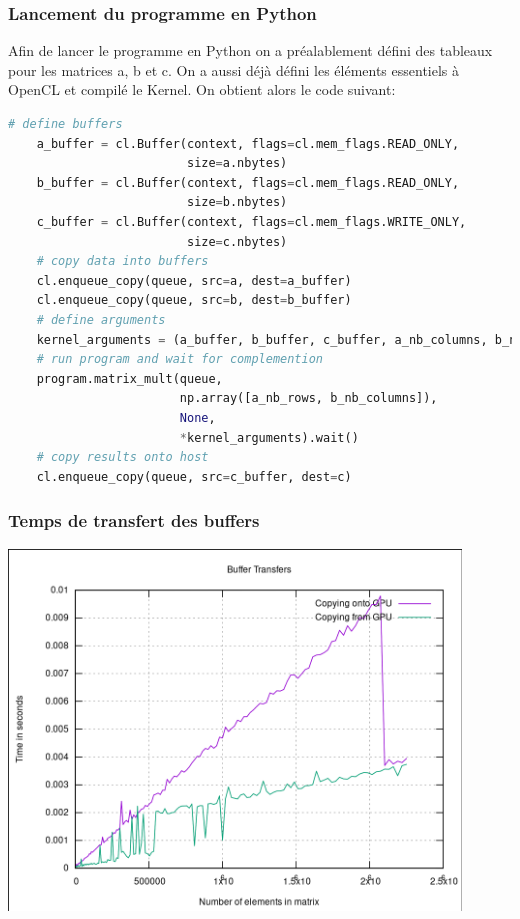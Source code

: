 \documentclass[8pt]{beamer}
\begin{document}
\begin{frame}[fragile]
    \frametitle{Lancement du programme en Python}
    Afin de lancer le programme en Python on a préalablement défini des 
    tableaux pour les matrices a, b et c. On a aussi déjà défini les éléments 
    essentiels à OpenCL et compilé le Kernel.
    On obtient alors le code suivant:
    \begin{lstlisting}[language=python]
    # define buffers
    a_buffer = cl.Buffer(context, flags=cl.mem_flags.READ_ONLY, 
                         size=a.nbytes)
    b_buffer = cl.Buffer(context, flags=cl.mem_flags.READ_ONLY, 
                         size=b.nbytes)
    c_buffer = cl.Buffer(context, flags=cl.mem_flags.WRITE_ONLY, 
                         size=c.nbytes)
    # copy data into buffers
    cl.enqueue_copy(queue, src=a, dest=a_buffer)
    cl.enqueue_copy(queue, src=b, dest=b_buffer)
    # define arguments
    kernel_arguments = (a_buffer, b_buffer, c_buffer, a_nb_columns, b_nb_columns)
    # run program and wait for complemention
    program.matrix_mult(queue,
                        np.array([a_nb_rows, b_nb_columns]),
                        None,
                        *kernel_arguments).wait()
    # copy results onto host
    cl.enqueue_copy(queue, src=c_buffer, dest=c)
    \end{lstlisting} 
\end{frame}

\begin{frame}
    \frametitle{Temps de transfert des buffers}
    \begin{center}
    \includegraphics[width=0.9\textwidth]{../resources/matrix_naive_buffer_transfer.pdf}
    \end{center}
\end{frame}
\end{document}
